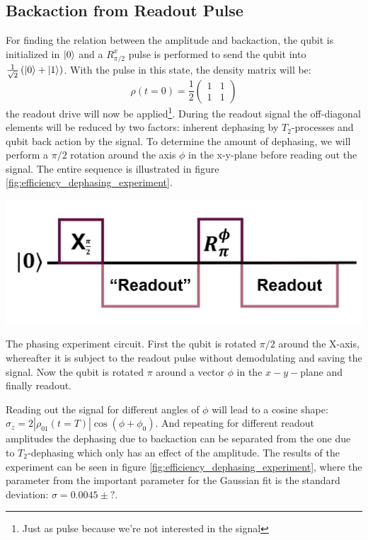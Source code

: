 \subsection{Backaction from Readout Pulse}
For finding the relation between the amplitude and backaction, the qubit is initialized in $\ket{0}$ and a $R^x_{\pi/2}$ pulse is performed to send the qubit into $\frac{1}{\sqrt{2}}\left(\ket{0} + \ket{1}\right)$. With the pulse in this state, the density matrix will be:
\begin{equation}
    \rho(t=0) = \frac12 \begin{pmatrix}1 & 1 \\ 1 & 1\end{pmatrix}
\end{equation}
the readout drive will now be applied\footnote{Just as pulse because we're not interested in the signal}. During the readout signal the off-diagonal elements will be reduced by two factors: inherent dephasing by $T_2$-processes and qubit back action by the signal. To determine the amount of dephasing, we will perform a $\pi/2$ rotation around the axis $\phi$ in the x-y-plane before reading out the signal. The entire sequence is illustrated in figure \ref{fig:efficiency_dephasing_experiment}.

\begin{marginfigure}
    \centering
    \includegraphics{Figs/circuits/dephasing.png}
    \caption{The phasing experiment circuit. First the qubit is rotated $\pi/2$ around the X-axis, whereafter it is subject to the readout pulse without demodulating and saving the signal. Now the qubit is rotated $\pi$ around a vector $\phi$ in the $x-y-$plane and finally readout.}
    \label{fig:efficiency_dephasing_experiment}
\end{marginfigure}

Reading out the signal for different angles of $\phi$ will lead to a cosine shape: $\sigma_z = 2 |\rho_{01}(t= T)| \cos(\phi+\phi_0)$. And repeating for different readout amplitudes the dephasing due to backaction can be separated from the one due to $T_2$-dephasing which only has an effect of the amplitude. The results of the experiment can be seen in figure \ref{fig:efficiency_dephasing_experiment}, where the parameter from the important parameter for the Gaussian fit is the standard deviation: $\sigma = 0.0045 \pm ?$. 


